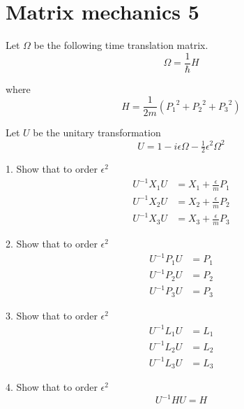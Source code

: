 

\section*{Matrix mechanics 5}

Let $\Omega$ be the following time translation matrix.
\begin{equation*}
\Omega=\frac{1}{\hbar}H
\end{equation*}

where
\begin{equation*}
H=\frac{1}{2m}\left({P_1}^2+{P_2}^2+{P_3}^2\right)
\end{equation*}

Let $U$ be the unitary transformation
\begin{equation*}
U=1-i\epsilon\Omega-\tfrac{1}{2}\epsilon^2\Omega^2
\end{equation*}

1. Show that to order $\epsilon^2$
\begin{align*}
U^{-1}X_1U&=X_1+\frac{\epsilon}{m}P_1
\\
U^{-1}X_2U&=X_2+\frac{\epsilon}{m}P_2
\\
U^{-1}X_3U&=X_3+\frac{\epsilon}{m}P_3
\end{align*}

2. Show that to order $\epsilon^2$
\begin{align*}
U^{-1}P_1U&=P_1
\\
U^{-1}P_2U&=P_2
\\
U^{-1}P_3U&=P_3
\end{align*}

3. Show that to order $\epsilon^2$
\begin{align*}
U^{-1}L_1U&=L_1
\\
U^{-1}L_2U&=L_2
\\
U^{-1}L_3U&=L_3
\end{align*}

4. Show that to order $\epsilon^2$
\begin{equation*}
U^{-1}HU=H
\end{equation*}


